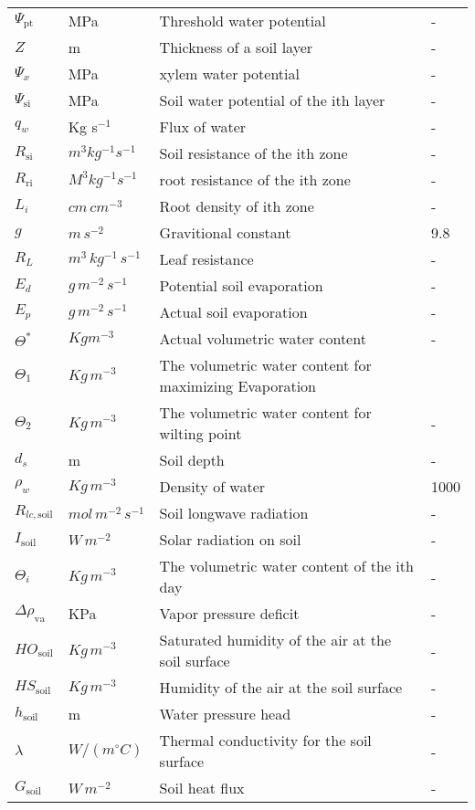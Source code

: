 \documentclass[12pt,fullpage]{report}
\begin{document}
\begin{center}
\begin{longtable}{l l p{3in} p{0.5in}}
$\Psi_{\text{pt}}$	&	MPa	&	Threshold water potential	&	-	\\
$Z$	&	m	&	Thickness of a soil layer	&	-	\\
$\Psi_x$	&	MPa	&	xylem water potential	&	-	\\
$\Psi_{\text{si}}$	&	MPa	&	Soil water potential of the ith layer	&	-	\\
$q_w$	&	Kg s$^{-1}$	&	Flux of water	&	-	\\
$R_{\text{si}}$	&	$m^3 kg^{-1} s^{-1}$	&	Soil resistance of the ith zone	&	-	\\
$R_{\text{ri}}$	&	$M^3 kg^{-1} s^{-1}$	&	root resistance of the ith zone	&	-	\\
$L_i$	&	$cm\, cm^{-3}$	&	Root density of ith zone	&	-	\\
$g$	&	$m\, s^{-2}$	&	Gravitional constant	&	9.8	\\
$R_L$	&	$m^3\, kg^{-1}\, s^{-1}$	&	Leaf resistance	&	-	\\
$E_d$	&	$g\, m^{-2}\, s^{-1}$	&	Potential soil evaporation	&	-	\\
$E_p$	&	$g\, m^{-2}\, s^{-1}$	&	Actual soil evaporation	&	-	\\
$\Theta^{*}$	&	$Kg m^{-3}$	&	Actual volumetric water content	&	-	\\
$\Theta_1$	&	$Kg\, m^{-3}$	&	The volumetric water content for maximizing Evaporation	&		\\
$\Theta_2$	&	$Kg\, m^{-3}$	&	The volumetric water content for wilting point	&	-	\\
$d_s$	&	m	&	Soil depth	&	-	\\
$\rho_w$	&	$Kg\, m^{-3}$	&	Density of water	&	1000	\\
$R_{lc,\text{soil}}$	&	$mol\, m^{-2}\, s^{-1}$	&	Soil longwave radiation	&	-	\\
$I_{\text{soil}}$	&	$W\, m^{-2}$	&	Solar radiation on soil	&	-	\\
$\Theta_i$	&	$Kg\, m^{-3}$	&	The volumetric water content of the ith day	&	-	\\
$\Delta \rho_{\text{va}}$	&	KPa	&	Vapor pressure deficit	&	-	\\
$HO_{\text{soil}}$	&	$Kg\,m^{-3}$	&	Saturated humidity of the air at the soil surface	&	-	\\
$HS_{\text{soil}}$	&	$Kg\, m^{-3}$	&	Humidity of the air at the soil surface	&	-	\\
$h_{\text{soil}}$	&	m	&	Water pressure head	&	-	\\
$\lambda$	&	$W/(m ^\circ C)$	&	Thermal conductivity for the soil surface	&	-	\\
$G_{\text{soil}}$	&	$W\,m^{-2}$	&	Soil heat flux	&	-	\\
\end{longtable}
\end{center}
\end{document}
